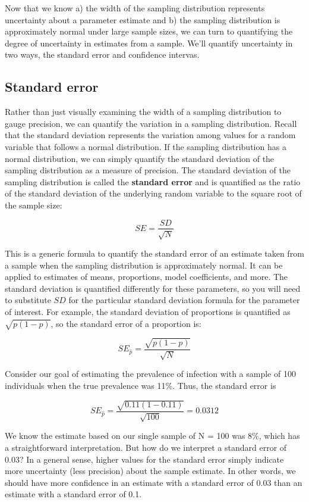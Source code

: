 \documentclass[
]{book}
\begin{document}
Now that we know a) the width of the sampling distribution represents uncertainty about a parameter estimate and b) the sampling distribution is approximately normal under large sample sizes, we can turn to quantifying the degree of uncertainty in estimates from a sample. We'll quantify uncertainty in two ways, the standard error and confidence intervas.

\subsection{Standard error}\label{standard-error}

Rather than just visually examining the width of a sampling distribution to gauge precision, we can quantify the variation in a sampling distribution. Recall that the standard deviation represents the variation among values for a random variable that follows a normal distribution. If the sampling distribution has a normal distribution, we can simply quantify the standard deviation of the sampling distribution as a measure of precision. The standard deviation of the sampling distribution is called the \textbf{standard error} and is quantified as the ratio of the standard deviation of the underlying random variable to the square root of the sample size:

\[
SE = \frac{SD}{\sqrt{N}} 
\]

This is a generic formula to quantify the standard error of an estimate taken from a sample when the sampling distribution is approximately normal. It can be applied to estimates of means, proportions, model coefficients, and more. The standard deviation is quantified differently for these parameters, so you will need to substitute \(SD\) for the particular standard deviation formula for the parameter of interest. For example, the standard deviation of proportions is quantified as \(\sqrt{p(1-p)}\), so the standard error of a proportion is:

\[
SE_{\hat{p}} = \frac{\sqrt{p(1-p)}}{\sqrt{N}}
\]

Consider our goal of estimating the prevalence of infection with a sample of 100 individuals when the true prevalence was 11\%. Thus, the standard error is

\[
SE_{\hat{p}} = \frac{\sqrt{0.11(1-0.11)}}{\sqrt{100}} = 0.0312
\]

We know the estimate based on our single sample of N = 100 was 8\%, which has a straightforward interpretation. But how do we interpret a standard error of 0.03? In a general sense, higher values for the standard error simply indicate more uncertainty (less precision) about the sample estimate. In other words, we should have more confidence in an estimate with a standard error of 0.03 than an estimate with a standard error of 0.1.
\end{document}

